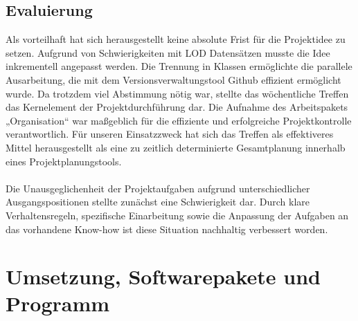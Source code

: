 \documentclass[a4paper, 11pt]{article}
\begin{document}
\subsection{Evaluierung}
Als vorteilhaft hat sich herausgestellt keine absolute Frist für die Projektidee zu setzen. Aufgrund von Schwierigkeiten mit LOD Datensätzen musste die Idee inkrementell angepasst werden. Die Trennung in Klassen ermöglichte die parallele Ausarbeitung, die mit dem Versionsverwaltungstool Github  effizient ermöglicht wurde. Da trotzdem viel Abstimmung nötig war, stellte das wöchentliche Treffen das Kernelement der Projektdurchführung dar.  Die Aufnahme des Arbeitspakets „Organisation“ war maßgeblich für die effiziente und erfolgreiche Projektkontrolle verantwortlich. Für unseren Einsatzzweck hat sich das Treffen als effektiveres Mittel herausgestellt als eine zu zeitlich determinierte Gesamtplanung innerhalb eines Projektplanungstools.\\\\
Die Unausgeglichenheit der Projektaufgaben aufgrund unterschiedlicher Ausgangspositionen stellte zunächst eine Schwierigkeit dar. Durch klare Verhaltensregeln, spezifische Einarbeitung sowie die Anpassung der Aufgaben an das vorhandene Know-how ist diese Situation nachhaltig verbessert worden.
\newpage
\section{Umsetzung, Softwarepakete und Programm}
\end{document}
